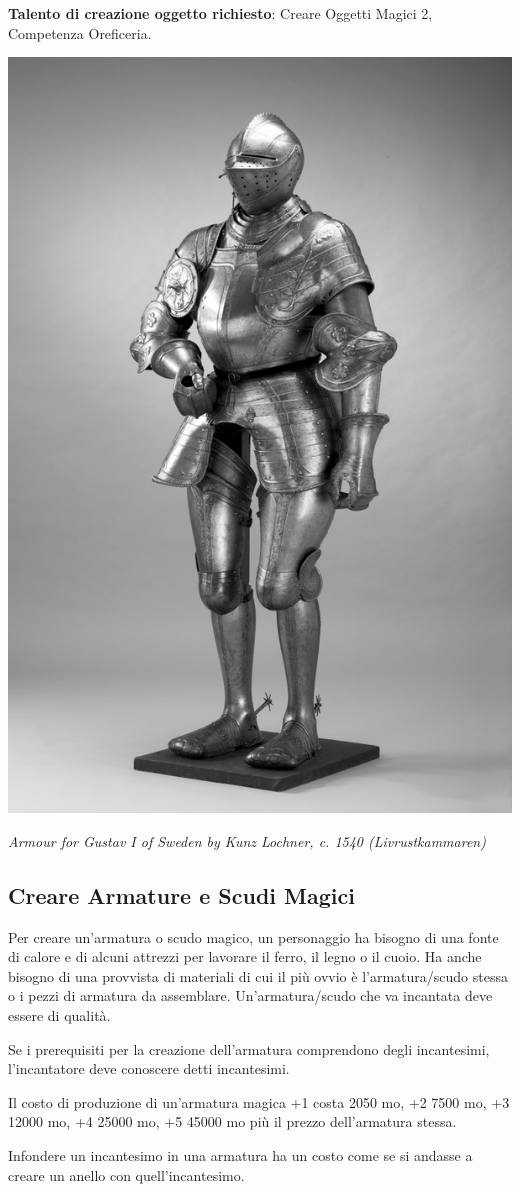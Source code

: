 \begin{multicols}{2}
\medskip

\textbf{Talento di creazione oggetto richiesto}: Creare Oggetti Magici 2, Competenza Oreficeria.

\begin{center}
	\includegraphics[width=0.55\linewidth]{immagini/Rustning_Gustav_Vasa.png}

	\emph{Armour for Gustav I of Sweden by Kunz Lochner, c. 1540 (Livrustkammaren)}
\end{center}

\subsection{Creare Armature e Scudi Magici}\label{crearearmaturemagiche}

Per creare un'armatura o scudo magico, un personaggio ha bisogno di una fonte di calore e di alcuni attrezzi per lavorare il ferro, il legno o il cuoio. Ha anche bisogno di una provvista di materiali di cui il più ovvio è l'armatura/scudo stessa o i pezzi di armatura da assemblare. Un'armatura/scudo che va incantata deve essere di qualità.

Se i prerequisiti per la creazione dell'armatura comprendono degli incantesimi, l'incantatore deve conoscere detti incantesimi.

Il costo di produzione di un'armatura magica +1 costa 2050 mo, +2 7500 mo, +3 12000 mo, +4 25000 mo, +5 45000 mo più il prezzo dell'armatura stessa.

Infondere un incantesimo in una armatura ha un costo come se si andasse a creare un anello con quell'incantesimo.


\end{multicols}
